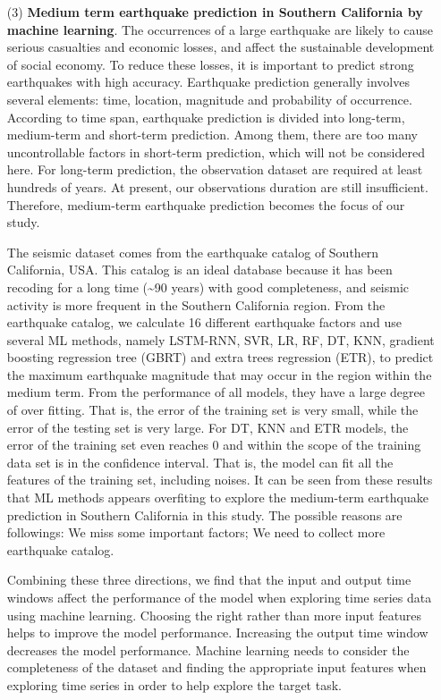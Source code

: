 \begin{enumerate}
  \item[(3)] \textbf{Medium term earthquake prediction in Southern California by machine learning}. The occurrences of a large earthquake are likely to cause serious casualties and economic losses, and affect the sustainable development of social economy. To reduce these losses, it is important to predict strong earthquakes with high accuracy. Earthquake prediction generally involves several elements: time, location, magnitude and probability of occurrence. According to time span, earthquake prediction is divided into long-term, medium-term and short-term prediction. Among them, there are too many uncontrollable factors in short-term prediction, which will not be considered here. For long-term prediction, the observation dataset are required at least hundreds of years. At present, our observations duration are still insufficient. Therefore, medium-term earthquake prediction becomes the focus of our study.

  The seismic dataset comes from the earthquake catalog of Southern California, USA. This catalog is an ideal database because it has been recoding for a long time (\sim 90 years) with good completeness, and seismic activity is more frequent in the Southern California region. From the earthquake catalog, we calculate 16 different earthquake factors and use several ML methods, namely LSTM-RNN, SVR, LR, RF, DT, KNN, gradient boosting regression tree (GBRT) and extra trees regression (ETR), to predict the maximum earthquake magnitude that may occur in the region within the medium term. From the performance of all models, they have a large degree of over fitting. That is, the error of the training set is very small, while the error of the testing set is very large. For DT, KNN and ETR models, the error of the training set even reaches 0 and within the scope of the training data set is in the confidence interval. That is, the model can fit all the features of the training set, including noises. It can be seen from these results that ML methods appears overfiting to explore the medium-term earthquake prediction in Southern California in this study. The possible reasons are followings: We miss some important factors; We need to collect more earthquake catalog.

  Combining these three directions, we find that the input and output time windows affect the performance of the model when exploring time series data using machine learning. Choosing the right rather than more input features helps to improve the model performance. Increasing the output time window decreases the model performance. Machine learning needs to consider the completeness of the dataset and finding the appropriate input features when exploring time series in order to help explore the target task.

\end{enumerate}
